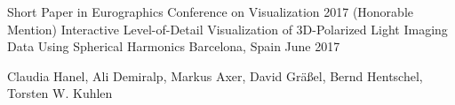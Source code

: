 \begin{cventries}
  \cventry
    {Short Paper in Eurographics Conference on Visualization 2017 (Honorable Mention)}
    {Interactive Level-of-Detail Visualization of 3D-Polarized Light Imaging Data Using Spherical Harmonics}
    {Barcelona, Spain}
    {June 2017}
    {
      \begin{cvitems}
        \item {Claudia Hanel, Ali Demiralp, Markus Axer, David Gräßel, Bernd Hentschel, Torsten W. Kuhlen}
      \end{cvitems}
    }
\end{cventries}

